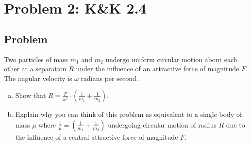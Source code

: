 \documentclass[solutions]{esg8012pset}
\begin{document}
\section*{Problem 2: K\&K 2.4}
\subsection*{Problem}
  Two particles of mass $m_1$ and $m_2$ undergo uniform circular motion about each other at a separation $R$ under the influence of an attractive force of magnitude $F$.  The angular velocity is $\omega$ radians per second.
  \begin{enumerate}[a)]
    \item Show that $R = \frac{F}{\omega^2} \cdot \left(\frac{1}{m_1} + \frac{1}{m_2}\right)$.
    \item Explain why you can think of this problem as equivalent to a single body of mass $\mu$ where $\frac{1}{\mu} = \left(\frac{1}{m_1} + \frac{1}{m_2}\right)$ undergoing circular motion of radius $R$ due to the influence of a central attractive force of magnitude $F$.
  \end{enumerate}
\end{document}
